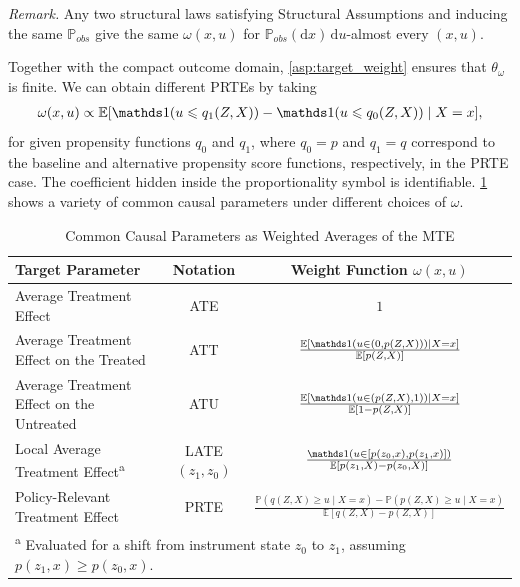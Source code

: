 \noindent\textit{Remark.} Any two structural laws satisfying Structural Assumptions and inducing the same $\mathbb P_{obs}$ give the same $\omega(x,u)$ for $\mathbb P_{obs}(\mathrm dx)\,\mathrm du$-almost every $(x,u)$.

Together with the compact outcome domain, \cref{asp:target_weight} ensures that $\theta_\omega$ is finite.
We can obtain different PRTEs by taking
\begin{align}\label{eq:omega_form}
    \omega(x,u) \propto \mathbb{E}[\indicator(u \leqslant q_1(Z,X)) - \indicator(u \leqslant q_0(Z,X)) \mid X=x],
\end{align}
for given propensity functions $q_0$ and $q_1$, where $q_0 = p$ and $q_1 = q$ correspond to the baseline and alternative propensity score functions, respectively, in the PRTE case. The coefficient hidden inside the proportionality symbol is identifiable. \cref{tab:causal_quantities} shows a variety of common causal parameters under different choices of $\omega$.
\begin{table}[htbp]
    \centering
    \caption{Common Causal Parameters as Weighted Averages of the MTE}
    \label{tab:causal_quantities}
    \renewcommand{\arraystretch}{1.8} %
    \begin{tabular}{lcc}
        \toprule
        \textbf{Target Parameter} & \textbf{Notation} & \textbf{Weight Function} $\omega(x,u)$ \\
        \midrule
        Average Treatment Effect & ATE & $1$ \\
        Average Treatment Effect on the Treated & ATT & $ \frac{\mathbb{E}[\indicator (u\in(0,p(Z,X)))\mid X=x]}{\mathbb{E}[p(Z,X)]}$ \\
        Average Treatment Effect on the Untreated & ATU & $ \frac{\mathbb{E}[\indicator (u\in(p(Z,X),1))\mid X=x]}{\mathbb{E}[1 - p(Z,X)]}$\\
        Local Average Treatment Effect\textsuperscript{a} & LATE$(z_1, z_0)$ & $ \frac{\indicator(u \in [p(z_0, x), p(z_1, x)])}{\mathbb{E}[p(z_1, X) - p(z_0, X)]}$ \\
        Policy-Relevant Treatment Effect & PRTE & $ \frac{\mathbb{P}(q(Z,X) \geqslant u \mid X=x) - \mathbb{P}(p(Z,X) \geqslant u \mid X=x)}{\mathbb{E}[q(Z,X) - p(Z,X)]}$ \\
        \bottomrule
        \multicolumn{3}{l}{\footnotesize \textsuperscript{a} Evaluated for a shift from instrument state $z_0$ to $z_1$, assuming $p(z_1, x) \geqslant p(z_0, x)$.}
    \end{tabular}
\end{table}

